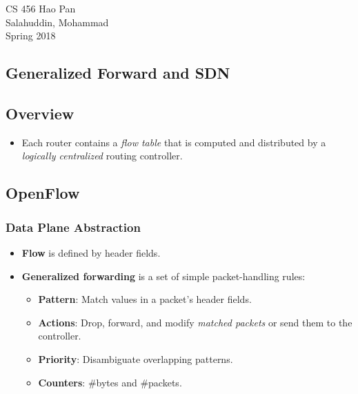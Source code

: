 \documentclass{article}
\begin{document}
\noindent
{CS 456 \hfill Hao Pan}\\
{Salahuddin, Mohammad}\\
{Spring 2018}


\begin{center}
\section{Generalized Forward and SDN}
\noindent
\end{center}

\subsection{Overview}

\begin{itemize}
\item Each router contains a \emph{flow table} that is computed and distributed by a \emph{logically centralized} routing controller.
\end{itemize}

\subsection{OpenFlow}

\subsubsection{Data Plane Abstraction}
\begin{itemize}
\item {\bf Flow} is defined by header fields.
\item {\bf Generalized forwarding} is a set of simple packet-handling rules:
\begin{itemize}
\item {\bf Pattern}: Match values in a packet's header fields.
\item {\bf Actions}: Drop, forward, and modify \emph{matched packets} or send them to the controller.
\item {\bf Priority}: Disambiguate overlapping patterns.
\item {\bf Counters}: \#bytes and \#packets.
\end{itemize}
\end{itemize}
\end{document}
